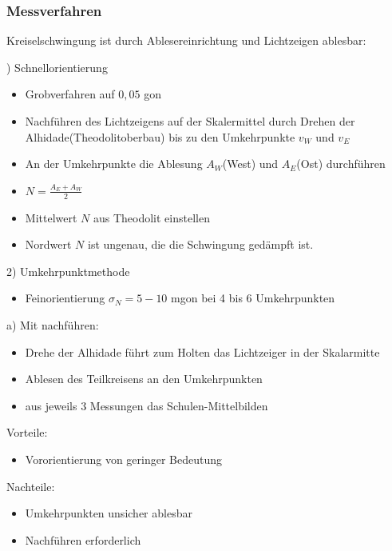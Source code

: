 \documentclass[12pt]{article}
\begin{document}
\subsubsection{Messverfahren}
Kreiselschwingung ist durch Ablesereinrichtung und Lichtzeigen ablesbar:
\begin{figure}[ht]\centering
\end{figure}
) Schnellorientierung
\begin{itemize}
	\item Grobverfahren auf $0,05$ gon
	\item Nachführen des Lichtzeigens auf der Skalermittel durch Drehen der Alhidade(Theodolitoberbau) bis zu den Umkehrpunkte $v_W$ und $v_E$
	\item An der Umkehrpunkte die Ablesung $A_W$(West) und $A_E$(Ost) durchführen
	\item $N = \frac{A_E + A_W}{2}$
	\item Mittelwert $N$ aus Theodolit einstellen
	\item Nordwert $N$ ist ungenau, die die Schwingung gedämpft ist.
\end{itemize}
2) Umkehrpunktmethode
\begin{itemize}
	\item Feinorientierung $\sigma_N = 5 - 10$ mgon bei 4 bis 6 Umkehrpunkten
\end{itemize}
a) Mit nachführen:
\begin{itemize}
	\item Drehe der Alhidade führt zum Holten das Lichtzeiger in der Skalarmitte
	\item Ablesen des Teilkreisens an den Umkehrpunkten
	\item aus jeweils 3 Messungen das Schulen-Mittelbilden
\end{itemize}
Vorteile:
\begin{itemize}
	\item Vororientierung von geringer Bedeutung 
\end{itemize}
Nachteile:
\begin{itemize}
	\item Umkehrpunkten unsicher ablesbar
	\item Nachführen erforderlich
\end{itemize}
\end{document}

